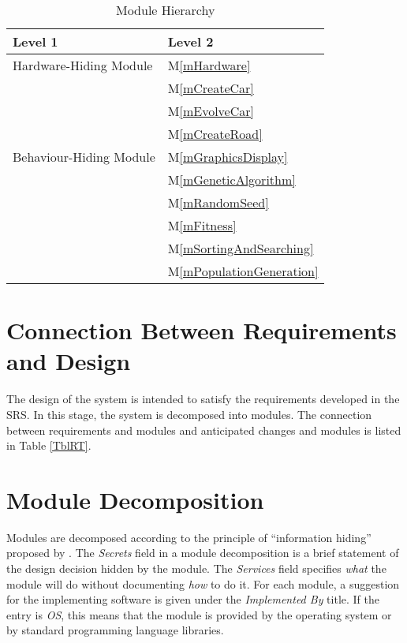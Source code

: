 \documentclass[12pt, titlepage]{article}
\newcommand{\mref}[1]{M\ref{#1}}
\begin{document}
\begin{table}[h!]
\centering
\begin{tabular}{p{} p{}}
\toprule
\textbf{Level 1} & \textbf{Level 2}\\
\midrule

{Hardware-Hiding Module} & \mref{mHardware} \\
\midrule

\multirow{7}{0.3\textwidth}{Behaviour-Hiding Module}
& \mref{mCreateCar}\\
& \mref{mEvolveCar}\\
& \mref{mCreateRoad}\\
& \mref{mGraphicsDisplay}\\
& \mref{mGeneticAlgorithm}\\
\midrule

\multirow{3}{0.3\textwidth}{Software Decision Module} 
& \mref{mRandomSeed}\\
& \mref{mFitness}\\
& \mref{mSortingAndSearching}\\
& \mref{mPopulationGeneration}\\

\bottomrule

\end{tabular}
\caption{Module Hierarchy}
\label{TblMH}
\end{table}

\section{Connection Between Requirements and Design} \label{SecConnection}

The design of the system is intended to satisfy the requirements developed in
the SRS. In this stage, the system is decomposed into modules. The connection
between requirements and modules  and anticipated changes and modules is listed in Table \ref{TblRT}. 

\section{Module Decomposition} \label{SecMD}

Modules are decomposed according to the principle of ``information hiding''
proposed by \citet{ParnasEtAl1984}. The \emph{Secrets} field in a module
decomposition is a brief statement of the design decision hidden by the
module. The \emph{Services} field specifies \emph{what} the module will do
without documenting \emph{how} to do it. For each module, a suggestion for the
implementing software is given under the \emph{Implemented By} title. If the
entry is \emph{OS}, this means that the module is provided by the operating
system or by standard programming language libraries. 
\end{document}
